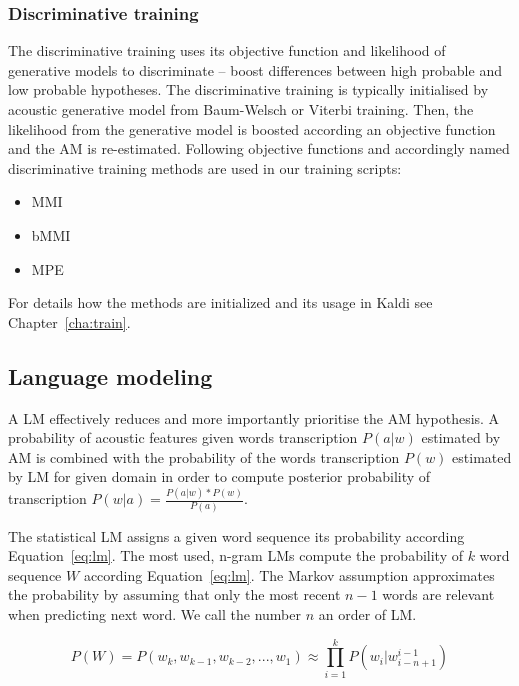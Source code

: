 \subsubsection*{Discriminative training}
\label{sub:subsection_name}
The discriminative training uses its objective function and likelihood of generative models to discriminate -- boost differences between high probable and low probable hypotheses.
The discriminative training is typically initialised by acoustic generative model from Baum-Welsch or Viterbi training.
Then, the likelihood from the generative model is boosted according an objective function and the \ac{AM} is re-estimated.
Following objective functions and accordingly named discriminative training methods are used in our training scripts:
\begin{itemize}
    \item \acl{MMI}\cite{chow1990maximum} 
    \item \acl{bMMI}\cite{povey2008boosted}
    \item \acl{MPE}\cite{povey2003mmi}
\end{itemize}
For details how the methods are initialized and its usage in Kaldi see Chapter~\ref{cha:train}.

\subsection{Language modeling}
\label{sub:lm}

A \acl{LM} effectively reduces and more importantly prioritise the \ac{AM} hypothesis.
A probability of acoustic features given words transcription $P(a|w)$ estimated by \ac{AM} is combined with the probability of the words transcription $P(w)$ estimated by \ac{LM} for given domain in order to compute posterior probability of transcription $P(w|a) = \frac{P(a|w)*P(w)}{P(a)}$.

The statistical \ac{LM} assigns a given word sequence its probability according Equation~\ref{eq:lm}.
The most used, n-gram \acp{LM} compute the probability of $k$ word sequence $W$ according Equation~\ref{eq:lm}.\cite{brants2007large}
The Markov assumption approximates the probability by assuming that only the most recent $n-1$ words are relevant when predicting next word.
We call the number $n$ an order of \ac{LM}.

\begin{equation} \label{eq:lm}
    P(W)=P(w_k,  w_{k-1}, w_{k-2}, ..., w_1) \approx \prod_{i=1}^{k}{P(w_i|w^{i-1}_{i-n+1})}
\end{equation}

